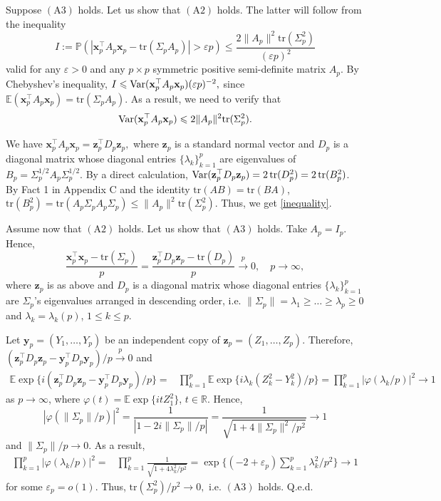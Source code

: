 \documentclass[12pt, a4paper]{article}
\newcommand\x{\mathbf x}
\newcommand\bR{{\mathbb R}}
\newcommand\z{{\mathbf z}}
\newcommand\y{{\mathbf y}}
\newcommand\pto{\stackrel p\rightarrow}
\newcommand\e{{\mathbb E}}
\newcommand\p{{\mathbb P}}
\newcommand\var{{\rm Var}}
\newcommand\tr{{\mathrm{tr}}}
\begin{document}
   
  Suppose $(\mathrm A3)$ holds. Let us show that $(\mathrm A2)$ holds. The latter will follow from the inequality
\begin{equation}\label{inequality}
I:=\p(|\x_p^\top A_p \x_p-\tr(\Sigma_pA_p)|>\varepsilon p)\leqslant
 \frac{2\|A_p\|^2\tr(\Sigma_p^2)}{(\varepsilon p)^{2}}
\end{equation}
valid for any $\varepsilon>0$ and any $p\times p$ symmetric positive semi-definite matrix $A_p$. By Chebyshev's inequality,  $I\leqslant \var(\x_p^\top A_p \x_p)(\varepsilon p)^{-2},$ since $\e(\x_p^\top A_p \x_p)=\tr(\Sigma_pA_p)$. As a result,  we need to verify that 
\begin{equation}
\label{v1}
\var(\x_p^\top A_{p} \x_p)  \leqslant 2\|A_p\|^2\tr(\Sigma_p^2). \end{equation}
 

 We have $\x_p^\top A_p \x_p=\z_p^\top D_p\z_p,$ where $\z_p$ is a standard normal vector and $D_p$ is a diagonal matrix whose diagonal entries $\{\lambda_k\}_{k=1}^p$ are eigenvalues of $B_p=\Sigma_p^{1/2}A_p\Sigma_p^{1/2}$. By a direct calculation,  $\var(\z_p^\top D_{p} \z_p)=2\,\tr(D_p^2)=2\,\tr(B_p^2)$. By  Fact 1 in Appendix C and the identity $\tr( AB)=\tr(BA)$, $\tr(B_p^2)=\tr( A_p\Sigma_p A_p\Sigma_p )\leqslant \|A_p\|^2\tr(\Sigma_p^2)$. Thus, we get \eqref{inequality}.

 Assume now that $(\mathrm A2)$ holds. Let us show that $(\mathrm A3)$ holds.  Take $A_p=I_p$. Hence,
\[\frac{\x_p^\top \x_p-\tr(\Sigma_p)}{p}=\frac{\z_p^\top D_p \z_p-\tr(D_p)}{p}\pto 0,\quad p\to\infty,\]
where $\z_p$ is as above and $D_p$ is a diagonal matrix whose diagonal entries  $\{\lambda_{k}\}_{k=1}^p$ are  $\Sigma_p$'s eigenvalues arranged in descending order, i.e.  $\|\Sigma_p\|=\lambda_{1}\geqslant\ldots\geqslant \lambda_{p}\geqslant0$ and $\lambda_k=\lambda_k(p)$, $1\leqslant k\leqslant p$.

Let $\y_p=(Y_1,\ldots,Y_p)$ be an independent copy of $\z_p=(Z_1,\ldots,Z_p)$. Therefore,
$(\z_p^\top D_p \z_p-\y_p^\top D_p \y_p)/p\pto 0$
 and
\begin{align*}\e\exp\{i(\z_p^\top D_p \z_p- \y_p^\top D_p \y_p)/p\}=&\prod_{k=1}^p\e\exp\{i \lambda_{k}(Z_k^2-Y_k^2)/p\}=\prod_{k=1}^p|\varphi(\lambda_{k}/p)|^2\to 1
\end{align*}
as $p\to\infty$, where  $\varphi(t)=\e\exp\{i tZ_1^2\}$, $t\in\bR$. Hence, \[|\varphi(\|\Sigma_p\|/p)|^2=\frac{1}{|1-2i\|\Sigma_p\|/p|}=
\frac{1}{\sqrt{1+4\|\Sigma_p\|^2/p^2}}\to 1\] and $\|\Sigma_p\|/p\to0 $. As a result, 
\begin{align*}\prod_{k=1}^p|\varphi(\lambda_{k}/p)|^2
=&\prod_{k=1}^p\frac1{\sqrt{1+4\lambda_{k}^2/p^2}}
=\exp\Big\{(-2+\varepsilon_p)\sum_{k=1}^p\lambda_{k}^2/p^2\Big\}\to 1\end{align*} for some $\varepsilon_p=o(1)$.
Thus, $\tr(\Sigma_p^2)/p^2\to0,$ i.e. $(\mathrm A3)$ holds.  Q.e.d.
\end{document}
